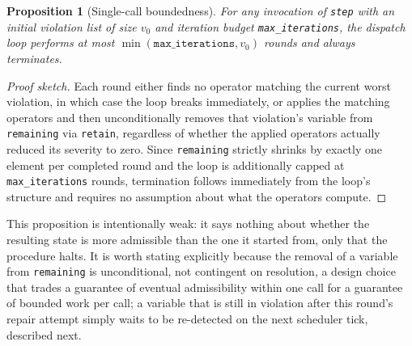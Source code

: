 \documentclass[11pt]{article}
\newtheorem{proposition}{Proposition}
\begin{document}
\begin{proposition}[Single-call boundedness]
For any invocation of \texttt{step} with an initial violation list of size $v_0$ and iteration budget \texttt{max\_iterations}, the dispatch loop performs at most $\min(\texttt{max\_iterations}, v_0)$ rounds and always terminates.
\end{proposition}
\begin{proof}[Proof sketch]
Each round either finds no operator matching the current worst violation, in which case the loop breaks immediately, or applies the matching operators and then unconditionally removes that violation's variable from \texttt{remaining} via \texttt{retain}, regardless of whether the applied operators actually reduced its severity to zero. Since \texttt{remaining} strictly shrinks by exactly one element per completed round and the loop is additionally capped at \texttt{max\_iterations} rounds, termination follows immediately from the loop's structure and requires no assumption about what the operators compute.
\end{proof}
This proposition is intentionally weak: it says nothing about whether the resulting state is more admissible than the one it started from, only that the procedure halts. It is worth stating explicitly because the removal of a variable from \texttt{remaining} is unconditional, not contingent on resolution, a design choice that trades a guarantee of eventual admissibility within one call for a guarantee of bounded work per call; a variable that is still in violation after this round's repair attempt simply waits to be re-detected on the next scheduler tick, described next.
\end{document}
